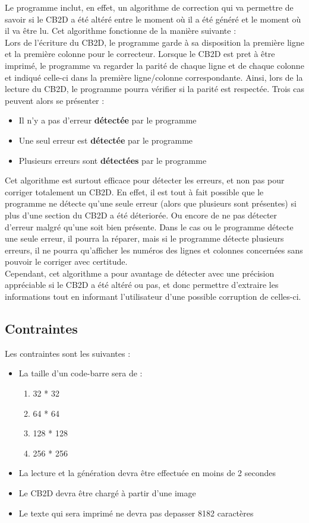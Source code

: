 Le programme inclut, en effet, un algorithme de correction qui va permettre de savoir si le CB2D a été altéré entre le moment où il a été généré et le moment où il va être lu. 
Cet algorithme fonctionne de la manière suivante : \\
Lors de l'écriture du CB2D, le programme garde à sa disposition la première ligne et la première colonne pour le correcteur. Lorsque le CB2D est pret à être imprimé, le programme va regarder la parité de chaque ligne et de chaque colonne et indiqué celle-ci dans la première ligne/colonne correspondante. Ainsi, lors de la lecture du CB2D, le programme pourra vérifier si la parité est respectée. Trois cas peuvent alors se présenter : 
\begin{itemize}
\item Il n'y a pas d'erreur \textbf{détectée} par le programme
\item Une seul erreur est \textbf{détectée} par le programme
\item Plusieurs erreurs sont \textbf{détectées} par le programme
\end{itemize} 
Cet algorithme est surtout efficace pour détecter les erreurs, et non pas pour corriger totalement un CB2D. En effet, il est tout à fait possible que le programme ne détecte qu'une seule erreur (alors que plusieurs sont présentes) si plus d'une section du CB2D a été déteriorée. Ou encore de ne pas détecter d'erreur malgré qu'une soit bien présente. 
Dans le cas ou le programme détecte une seule erreur, il pourra la réparer, mais si le programme détecte plusieurs erreurs, il ne pourra qu'afficher les numéros des lignes et colonnes concernées sans pouvoir le corriger avec certitude. \\
Cependant, cet algorithme a pour avantage de détecter avec une précision appréciable si le CB2D a été altéré ou pas, et donc permettre d'extraire les informations tout en informant l'utilisateur d'une possible corruption de celles-ci.

\subsection{Contraintes}

Les contraintes sont les suivantes : 

\begin{itemize}
\item La taille d'un code-barre sera de :
	\begin{enumerate}
	\item 32 * 32 
	\item 64 * 64 
	\item 128 * 128 
	\item 256 * 256
	\end{enumerate}
\item La lecture et la génération devra être effectuée en moins de 2 secondes
\item Le CB2D devra être chargé à partir d'une image
\item Le texte qui sera imprimé ne devra pas depasser 8182 caractères
\end{itemize}


